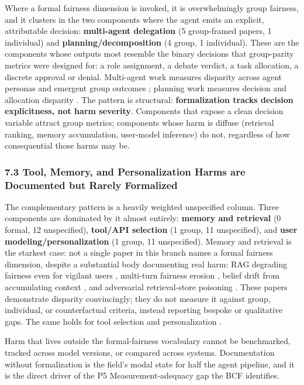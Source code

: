\documentclass[10pt]{article}
\begin{document}
Where a formal fairness dimension is invoked, it is overwhelmingly group fairness, and it clusters in the two components where the agent emits an explicit, attributable decision: \textbf{multi-agent delegation} (5 group-framed papers, 1 individual) and \textbf{planning/decomposition} (4 group, 1 individual). These are the components whose outputs most resemble the binary decisions that group-parity metrics were designed for: a role assignment, a debate verdict, a task allocation, a discrete approval or denial. Multi-agent work measures disparity across agent personas and emergent group outcomes \cite{madigan2025emergent,nguyen2025social,li2025from,mirza2025malibu}; planning work measures decision and allocation disparity \cite{li2025actions,hall2025guiding,parziale2026once}. The pattern is structural: \textbf{formalization tracks decision explicitness, not harm severity}. Components that expose a clean decision variable attract group metrics; components whose harm is diffuse (retrieval ranking, memory accumulation, user-model inference) do not, regardless of how consequential those harms may be.

\subsubsection*{7.3 Tool, Memory, and Personalization Harms are Documented but Rarely Formalized}

The complementary pattern is a heavily weighted unspecified column. Three components are dominated by it almost entirely: \textbf{memory and retrieval} (0 formal, 12 unspecified), \textbf{tool/API selection} (1 group, 11 unspecified), and \textbf{user modeling/personalization} (1 group, 11 unspecified). Memory and retrieval is the starkest case: not a single paper in this branch names a formal fairness dimension, despite a substantial body documenting real harm: RAG degrading fairness even for vigilant users \cite{hu2024free}, multi-turn fairness erosion \cite{fan2024fairmt}, belief drift from accumulating context \cite{geng2025accumulating,simhi2026old}, and adversarial retrieval-store poisoning \cite{wang2025bias}. These papers demonstrate disparity convincingly; they do not measure it against group, individual, or counterfactual criteria, instead reporting bespoke or qualitative gaps. The same holds for tool selection \cite{blankenstein2025biasbusters,sneh2025tooltweak} and personalization \cite{kantharuban2024stereotype,pawar2025presumed,mire2025rejected,tonneau2026different}.

Harm that lives outside the formal-fairness vocabulary cannot be benchmarked, tracked across model versions, or compared across systems. Documentation without formalization is the field's modal state for half the agent pipeline, and it is the direct driver of the P5 Measurement-adequacy gap the BCF identifies.
\end{document}
